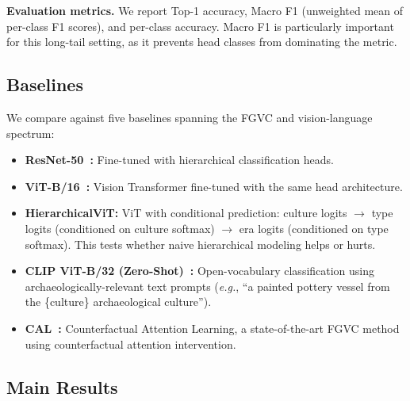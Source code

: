 \documentclass[10pt,twocolumn,letterpaper]{article}
\begin{document}
\textbf{Evaluation metrics.} We report Top-1 accuracy, Macro F1 (unweighted mean of per-class F1 scores), and per-class accuracy. Macro F1 is particularly important for this long-tail setting, as it prevents head classes from dominating the metric.

\subsection{Baselines}

We compare against five baselines spanning the FGVC and vision-language spectrum:

\begin{itemize}
    \item \textbf{ResNet-50~\cite{he2016deep}:} Fine-tuned with hierarchical classification heads.
    \item \textbf{ViT-B/16~\cite{dosovitskiy2021image}:} Vision Transformer fine-tuned with the same head architecture.
    \item \textbf{HierarchicalViT:} ViT with conditional prediction: culture logits $\rightarrow$ type logits (conditioned on culture softmax) $\rightarrow$ era logits (conditioned on type softmax). This tests whether naive hierarchical modeling helps or hurts.
    \item \textbf{CLIP ViT-B/32 (Zero-Shot)~\cite{radford2021learning}:} Open-vocabulary classification using archaeologically-relevant text prompts (\emph{e.g.}, ``a painted pottery vessel from the \{culture\} archaeological culture'').
    \item \textbf{CAL~\cite{rao2021counterfactual}:} Counterfactual Attention Learning, a state-of-the-art FGVC method using counterfactual attention intervention.
\end{itemize}

\subsection{Main Results}
\end{document}
